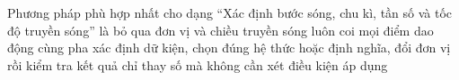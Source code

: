 \begin{ex}
Phương pháp phù hợp nhất cho dạng “Xác định bước sóng, chu kì, tần số và tốc độ truyền sóng” là
\choice
{bỏ qua đơn vị và chiều truyền sóng}
{luôn coi mọi điểm dao động cùng pha}
{\True xác định dữ kiện, chọn đúng hệ thức hoặc định nghĩa, đổi đơn vị rồi kiểm tra kết quả}
{chỉ thay số mà không cần xét điều kiện áp dụng}
\end{ex}
